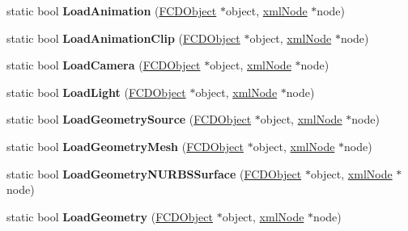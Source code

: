 \begin{DoxyCompactItemize}
\item 
\hypertarget{classFArchiveXML_a1556e23523434a156d05927399317f75}{
static bool {\bfseries LoadAnimation} (\hyperlink{classFCDObject}{FCDObject} $\ast$object, \hyperlink{struct__xmlNode}{xmlNode} $\ast$node)}
\label{classFArchiveXML_a1556e23523434a156d05927399317f75}

\item 
\hypertarget{classFArchiveXML_a8059e941d148962985a842ec7fc4ab9d}{
static bool {\bfseries LoadAnimationClip} (\hyperlink{classFCDObject}{FCDObject} $\ast$object, \hyperlink{struct__xmlNode}{xmlNode} $\ast$node)}
\label{classFArchiveXML_a8059e941d148962985a842ec7fc4ab9d}

\item 
\hypertarget{classFArchiveXML_a7ca2c2a7c5b93049947ff855936e2036}{
static bool {\bfseries LoadCamera} (\hyperlink{classFCDObject}{FCDObject} $\ast$object, \hyperlink{struct__xmlNode}{xmlNode} $\ast$node)}
\label{classFArchiveXML_a7ca2c2a7c5b93049947ff855936e2036}

\item 
\hypertarget{classFArchiveXML_a0cfda9575a465a13ffe357491e622cce}{
static bool {\bfseries LoadLight} (\hyperlink{classFCDObject}{FCDObject} $\ast$object, \hyperlink{struct__xmlNode}{xmlNode} $\ast$node)}
\label{classFArchiveXML_a0cfda9575a465a13ffe357491e622cce}

\item 
\hypertarget{classFArchiveXML_abd6b7eedb5a38c372c868d00584803cc}{
static bool {\bfseries LoadGeometrySource} (\hyperlink{classFCDObject}{FCDObject} $\ast$object, \hyperlink{struct__xmlNode}{xmlNode} $\ast$node)}
\label{classFArchiveXML_abd6b7eedb5a38c372c868d00584803cc}

\item 
\hypertarget{classFArchiveXML_a2efcffe1c9d1a5995041c1c67e4c8880}{
static bool {\bfseries LoadGeometryMesh} (\hyperlink{classFCDObject}{FCDObject} $\ast$object, \hyperlink{struct__xmlNode}{xmlNode} $\ast$node)}
\label{classFArchiveXML_a2efcffe1c9d1a5995041c1c67e4c8880}

\item 
\hypertarget{classFArchiveXML_a7cbb70e74b9798c3b5522da0fb7fafb8}{
static bool {\bfseries LoadGeometryNURBSSurface} (\hyperlink{classFCDObject}{FCDObject} $\ast$object, \hyperlink{struct__xmlNode}{xmlNode} $\ast$node)}
\label{classFArchiveXML_a7cbb70e74b9798c3b5522da0fb7fafb8}

\item 
\hypertarget{classFArchiveXML_aae7d1bddc6e15d3dce05b47ae15cb4d2}{
static bool {\bfseries LoadGeometry} (\hyperlink{classFCDObject}{FCDObject} $\ast$object, \hyperlink{struct__xmlNode}{xmlNode} $\ast$node)}
\label{classFArchiveXML_aae7d1bddc6e15d3dce05b47ae15cb4d2}


\end{DoxyCompactItemize}
